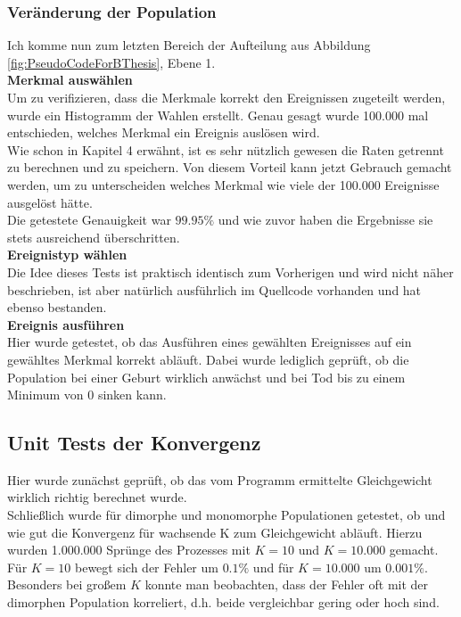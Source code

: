 \documentclass[11pt, a4paper, german]{article}
\theoremstyle{plain}
\begin{document}
	\subsubsection{Veränderung der Population}
	Ich komme nun zum letzten Bereich der Aufteilung aus Abbildung \ref{fig:PseudoCodeForBThesis}, Ebene 1.\\
	
	\textbf{Merkmal auswählen}\\
	Um zu verifizieren, dass die Merkmale korrekt den Ereignissen zugeteilt werden, wurde ein Histogramm der Wahlen erstellt. Genau gesagt wurde 100.000 mal entschieden, welches Merkmal ein Ereignis auslösen wird.\\
	Wie schon in Kapitel 4 erwähnt, ist es sehr nützlich gewesen die Raten getrennt zu berechnen und zu speichern. Von diesem Vorteil kann jetzt Gebrauch gemacht werden, um zu unterscheiden welches Merkmal wie viele der 100.000 Ereignisse ausgelöst hätte.\\
	Die getestete Genauigkeit war $ 99.95\% $ und wie zuvor haben die Ergebnisse sie stets ausreichend überschritten.\\
	
	\textbf{Ereignistyp wählen}\\
	Die Idee dieses Tests ist praktisch identisch zum Vorherigen und wird nicht näher beschrieben, ist aber natürlich ausführlich im Quellcode vorhanden und hat ebenso bestanden.\\
	
	\textbf{Ereignis ausführen}\\
	Hier wurde getestet, ob das Ausführen eines gewählten Ereignisses auf ein gewähltes Merkmal korrekt abläuft. Dabei wurde lediglich geprüft, ob die Population bei einer Geburt wirklich anwächst und bei Tod bis zu einem Minimum von 0 sinken kann.
	
	\subsection{Unit Tests der Konvergenz}
	Hier wurde zunächst geprüft, ob das vom Programm ermittelte Gleichgewicht wirklich richtig berechnet wurde.\\
	Schließlich wurde für dimorphe und monomorphe Populationen getestet, ob und wie gut die Konvergenz für wachsende K zum Gleichgewicht abläuft. Hierzu wurden 1.000.000 Sprünge des Prozesses mit $ K = 10 $ und $ K = 10.000 $ gemacht. Für $ K = 10 $ bewegt sich der Fehler um $ 0.1\% $ und für $ K = 10.000 $ um $ 0.001\% $. Besonders bei großem $ K $ konnte man beobachten, dass der Fehler oft mit der dimorphen Population korreliert, d.h. beide vergleichbar gering oder hoch sind.
	
\end{document}
